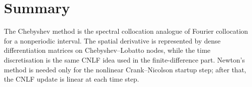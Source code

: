 \documentclass[11pt]{article}
\begin{document}
\section{Summary}

The Chebyshev method is the spectral collocation analogue of Fourier collocation for
a nonperiodic interval.  The spatial derivative is represented by dense
differentiation matrices on Chebyshev--Lobatto nodes, while the time discretisation is
the same CNLF idea used in the finite-difference part.  Newton's method is needed only
for the nonlinear Crank--Nicolson startup step; after that, the CNLF update is linear
at each time step.
\end{document}
